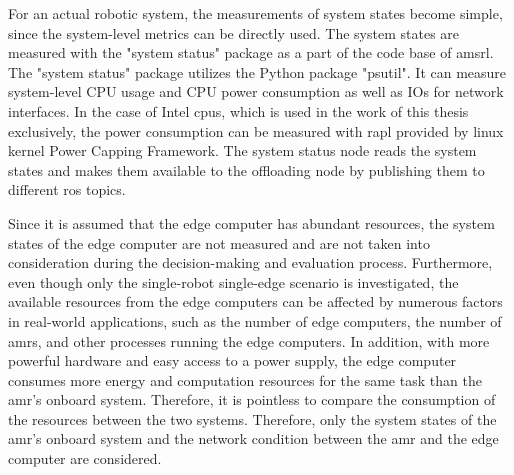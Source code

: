 For an actual robotic system, the measurements of system states become simple, since the system-level metrics can be directly used. The system states are measured with the "system status" package as a part of the code base of \gls{amsrl}. The "system status" package utilizes the Python package "\gls{psutil}". It can measure system-level CPU usage and CPU power consumption as well as IOs for network interfaces. In the case of Intel \glspl{cpu}, which is used in the work of this thesis exclusively, the power consumption can be measured with \gls{rapl} provided by \gls{linux} kernel Power Capping Framework. The system status node reads the system states and makes them available to the offloading node by publishing them to different \gls{ros} topics. 

Since it is assumed that the edge computer has abundant resources, the system states of the edge computer are not measured and are not taken into consideration during the decision-making and evaluation process. Furthermore, even though only the single-robot single-edge scenario is investigated, the available resources from the edge computers can be affected by numerous factors in real-world applications, such as the number of edge computers, the number of \glspl{amr}, and other processes running the edge computers. In addition, with more powerful hardware and easy access to a power supply, the edge computer consumes more energy and computation resources for the same task than the \gls{amr}'s onboard system. Therefore, it is pointless to compare the consumption of the resources between the two systems. Therefore, only the system states of the \gls{amr}'s onboard system and the network condition between the \gls{amr} and the edge computer are considered.

